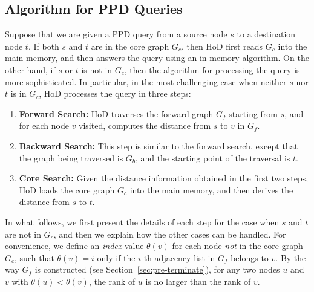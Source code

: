 \documentclass{sig-alternate}
\def\GC{G_c}
\def\GF{G_f}
\def\GB{G_b}
\begin{document}
\begin{sloppy}
%
\section{Algorithm for PPD Queries} \label{sec:p2p}

Suppose that we are given a PPD query from a source node $s$ to a destination node $t$. If both $s$ and $t$ are in the core graph $\GC$, then HoD first reads $\GC$ into the main memory, and then answers the query using an in-memory algorithm. On the other hand, if $s$ or $t$ is not in $\GC$, then the algorithm for processing the query is more sophisticated. In particular, in the most challenging case when neither $s$ nor $t$ is in $\GC$, HoD processes the query in three steps:
\begin{enumerate}%
\item {\bf Forward Search:} HoD traverses the forward graph $\GF$ starting from $s$, and for each node $v$ visited, computes the distance from $s$ to $v$ in $\GF$.

\item {\bf Backward Search:} This step is similar to the forward search, except that the graph being traversed is $\GB$, and the starting point of the traversal is $t$.

\item {\bf Core Search:} Given the distance information obtained in the first two steps, HoD loads the core graph $\GC$ into the main memory, and then derives the distance from $s$ to $t$.
\end{enumerate}
In what follows, we first present the details of each step for the case when $s$ and $t$ are not in $\GC$, and then we explain how the other cases can be handled. For convenience, we define an {\em index} value $\theta(v)$ for each node {\em not} in the core graph $\GC$, such that $\theta(v) = i$ only if the $i$-th adjacency list in $\GF$ belongs to $v$. By the way $\GF$ is constructed (see Section~\ref{sec:pre-terminate}), for any two nodes $u$ and $v$ with $\theta(u) < \theta(v)$, the rank of $u$ is no larger than the rank of $v$.



\end{sloppy}
\end{document}
